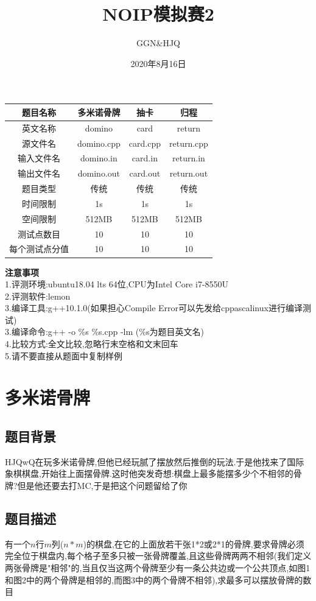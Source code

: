 \documentclass[12pt]{ctexart}
\title{\textbf{NOIP模拟赛2}}
\author{GGN\&HJQ}
\date{2020年8月16日}
\begin{document}
\maketitle
\begin{center}
	\begin{tabular}{|c|c|c|c|}
		\hline 题目名称&多米诺骨牌&抽卡&归程\\
		\hline 英文名称&domino&card&return\\
		\hline 源文件名&domino.cpp&card.cpp&return.cpp\\
		\hline 输入文件名&domino.in&card.in&return.in\\
		\hline 输出文件名&domino.out&card.out&return.out\\
		\hline 题目类型&传统&传统&传统\\
		\hline 时间限制&1s&1s&1s\\
		\hline 空间限制&512MB&512MB&512MB\\
		\hline 测试点数目&10&10&10\\
		\hline 每个测试点分值&10&10&10\\
		\hline
	\end{tabular}
\end{center}
\textbf{注意事项}\\
1.评测环境:ubuntu18.04 lts 64位,CPU为Intel Core i7-8550U\\
2.评测软件:lemon\\
3.编译工具:g++10.1.0(如果担心Compile Error可以先发给cppascalinux进行编译测试)\\
3.编译命令:g++ -o \%s \%s.cpp -lm (\%s为题目英文名)\\
4.比较方式:全文比较,忽略行末空格和文末回车\\
5.请不要直接从题面中复制样例
\newpage
\section{多米诺骨牌}
\subsection{题目背景}
HJQwQ在玩多米诺骨牌,但他已经玩腻了摆放然后推倒的玩法.于是他找来了国际象棋棋盘,开始往上面摆骨牌.这时他突发奇想:棋盘上最多能摆多少个不相邻的骨牌?但是他还要去打MC,于是把这个问题留给了你
\subsection{题目描述}
有一个$n$行$m$列($n*m$)的棋盘,在它的上面放若干张1*2或2*1的骨牌,要求骨牌必须完全位于棋盘内,每个格子至多只被一张骨牌覆盖,且这些骨牌两两不相邻(我们定义两张骨牌是"相邻"的,当且仅当这两个骨牌至少有一条公共边或一个公共顶点,如图1和图2中的两个骨牌是相邻的,而图3中的两个骨牌不相邻),求最多可以摆放骨牌的数目
\end{document}
